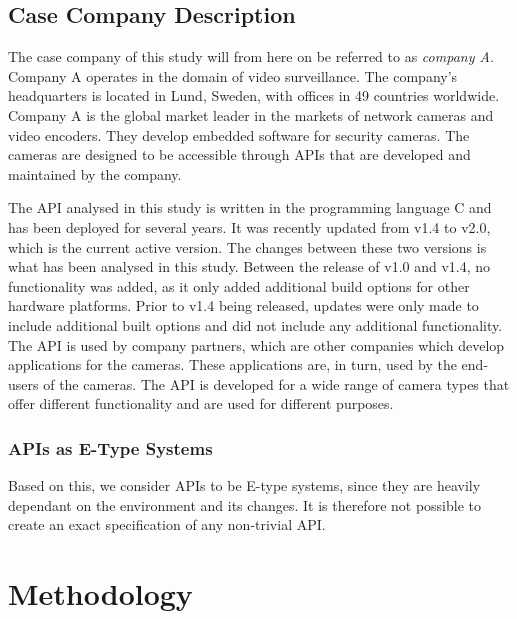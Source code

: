 \documentclass{sig-alternate}
\begin{document}
\subsection{Case Company Description} \label{case_company_description}
The case company of this study will from here on be referred to as \textit{company A}. Company A operates in the domain of video surveillance. The company's headquarters is located in Lund, Sweden, with offices in 49 countries worldwide. Company A is the global market leader in the markets of network cameras and video encoders. They develop embedded software for security cameras. The cameras are designed to be accessible through APIs that are developed and maintained by the company. 

The API analysed in this study is written in the programming language C and has been deployed for several years. It was recently updated from v1.4 to v2.0, which is the current active version. The changes between these two versions is what has been analysed in this study. Between the release of v1.0 and v1.4, no functionality was added, as it only added additional build options for other hardware platforms. Prior to v1.4 being released, updates were only made to include additional built options and did not include any additional functionality. The API is used by company partners, which are other companies which develop applications for the cameras. These applications are, in turn, used by the end-users of the cameras. The API is developed for a wide range of camera types that offer different functionality and are used for different purposes. 

\subsubsection{APIs as E-Type Systems}
Based on this, we consider APIs to be E-type systems, since they are heavily dependant on the environment and its changes. It is therefore not possible to create an exact specification of any non-trivial API. 



\section{Methodology} \label{methodology}
\end{document}
